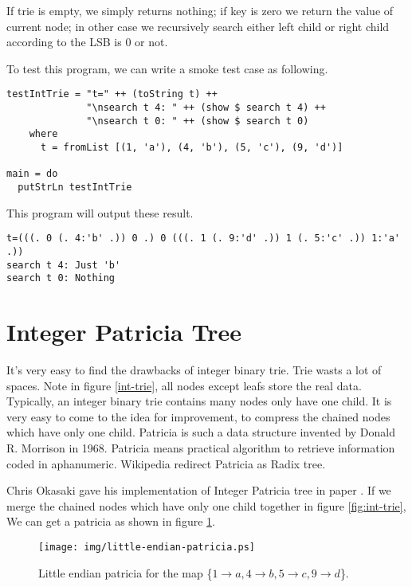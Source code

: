 \documentclass{article}
\begin{document}
If trie is empty, we simply returns nothing; if key is zero we return the 
value of current node; in other case we recursively search either left
child or right child according to the LSB is 0 or not.

To test this program, we can write a smoke test case as following.

\begin{lstlisting}
testIntTrie = "t=" ++ (toString t) ++ 
              "\nsearch t 4: " ++ (show $ search t 4) ++
              "\nsearch t 0: " ++ (show $ search t 0)
    where
      t = fromList [(1, 'a'), (4, 'b'), (5, 'c'), (9, 'd')]

main = do
  putStrLn testIntTrie
\end{lstlisting}

This program will output these result.

\begin{verbatim}
t=(((. 0 (. 4:'b' .)) 0 .) 0 (((. 1 (. 9:'d' .)) 1 (. 5:'c' .)) 1:'a' .))
search t 4: Just 'b'
search t 0: Nothing
\end{verbatim}


\section{Integer Patricia Tree} 
\label{int-patricia}

It's very easy to find the drawbacks of integer binary trie. Trie wasts a lot of 
spaces. Note in figure \ref{int-trie}, all nodes except leafs store the real data.
Typically, an integer binary trie contains many nodes only have one child.
It is very easy to come to the idea for improvement, to compress the chained nodes
which have only one child. Patricia is such a data structure invented by 
Donald R. Morrison in 1968. Patricia means practical algorithm to retrieve information coded
in aphanumeric\cite{patricia-morrison}. Wikipedia redirect Patricia as Radix tree.

Chris Okasaki gave his implementation of Integer Patricia tree in paper \cite{okasaki-int-map}. 
If we merge the chained nodes which have only one child together in figure \ref{fig:int-trie},
We can get a patricia as shown in figure \ref{fig:little-endian-patricia}.

\begin{figure}[htbp]
       \begin{center}
	\texttt{[image: img/little-endian-patricia.ps]}
        \caption{Little endian patricia for the map 
                        \{$ 1 \rightarrow a, 4 \rightarrow b, 5 \rightarrow c, 9 \rightarrow d$\}.} 
        \label{fig:little-endian-patricia}
       \end{center}
\end{figure}
\end{document}
